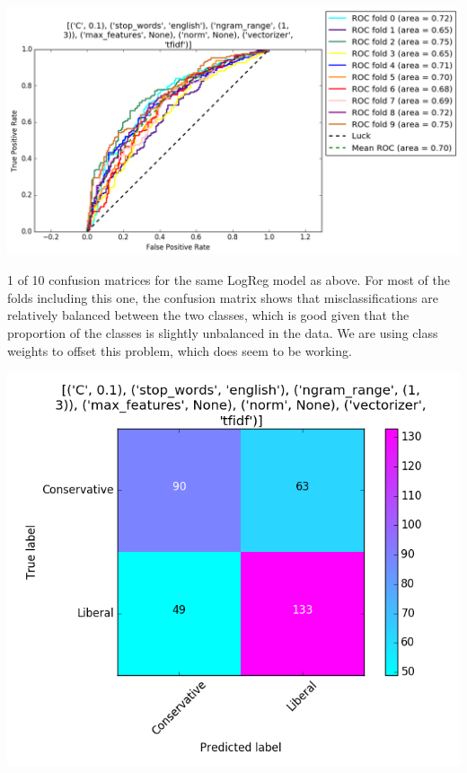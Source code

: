 \documentclass[11pt]{article}
\begin{document}
\includegraphics[scale=0.65]{UpdateVis/ROCPlot}

1 of 10 confusion matrices for the same LogReg model as above. For most of the folds including this one, the confusion matrix shows that misclassifications are relatively balanced between the two classes, which is good given that the proportion of the classes is slightly unbalanced in the data. We are using class weights to offset this problem, which does seem to be working.

\includegraphics[scale=0.65]{UpdateVis/cm_fold9.png}
\end{document}
